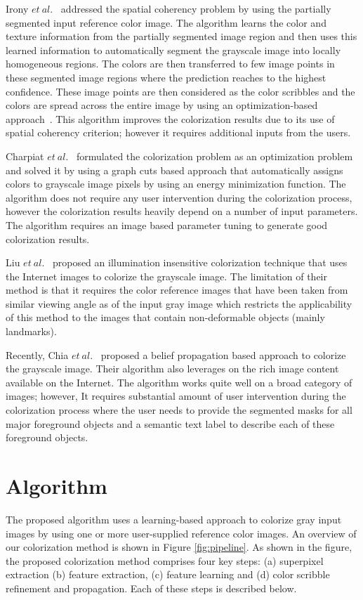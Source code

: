 \documentclass[twocolumn]{svjour3}          %
\begin{document}
Irony $et\ al.$~\cite{Irony05} addressed the spatial coherency problem by using the partially segmented input reference color image. The algorithm learns the color and texture information from the partially segmented image region and then uses this learned information to automatically segment the grayscale image into locally homogeneous regions. The colors are then transferred to few image points in these segmented image regions where the prediction reaches to the highest confidence. These image points are then considered as the color scribbles and the colors are spread across the entire image by using an optimization-based approach~\cite{Levin04}. This algorithm improves the colorization results due to its use of spatial coherency criterion; however it requires additional inputs from the users.
 
Charpiat $et\ al.$~\cite{Charpiat08} formulated the colorization problem as an optimization problem and solved it by using a graph cuts based approach that automatically assigns colors to grayscale image pixels by using an energy minimization function. The algorithm does not require any user intervention during the colorization process, however the colorization results heavily depend on a number of input parameters. The algorithm requires an image based parameter tuning to generate good colorization results.

Liu $et\ al.$~\cite{Liu08} proposed an illumination insensitive colorization technique that uses the Internet images to colorize the grayscale image. The limitation of their method is that it requires the color reference images that have been taken from similar viewing angle as of the input gray image which restricts the applicability of this method to the images that contain non-deformable objects (mainly landmarks). 

Recently, Chia $et\ al.$~\cite{Alex11} proposed a belief propagation based approach to colorize the grayscale image. Their algorithm also leverages on the rich image content available on the Internet. The algorithm works quite well on a broad category of images; however, It requires substantial amount of user intervention during the colorization process where the user needs to provide the segmented masks for all major foreground objects and a semantic text label to describe each of these foreground objects.


\section{Algorithm}
\label{sec:3}
The proposed algorithm uses a learning-based approach to colorize gray input images by using one or more user-supplied reference color images. An overview of our colorization method is shown in Figure \ref{fig:pipeline}. As shown in the figure, the proposed colorization method comprises four key steps: (a) superpixel extraction (b) feature extraction, (c) feature learning and (d) color scribble refinement and propagation. Each of these steps is described below. 
\end{document}
